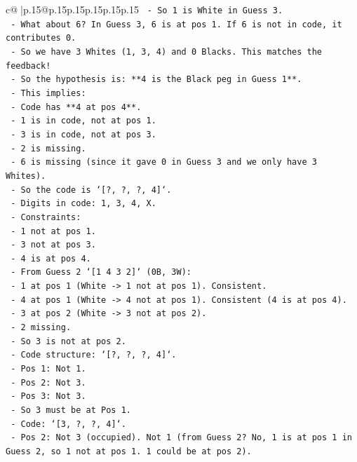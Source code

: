 \documentclass{article}
\begin{document}
{\begin{supertabular}{c@{$\;$}|p{.15\linewidth}@{}p{.15\linewidth}p{.15\linewidth}p{.15\linewidth}p{.15\linewidth}p{.15\linewidth}}
{{{\texttt{    {-} So 1 is White in Guess 3.} \\
\texttt{    {-} What about 6? In Guess 3, 6 is at pos 1. If 6 is not in code, it contributes 0.} \\
\texttt{    {-} So we have 3 Whites (1, 3, 4) and 0 Blacks. This matches the feedback!} \\
\texttt{    {-} So the hypothesis is: **4 is the Black peg in Guess 1**.} \\
\texttt{    {-} This implies:} \\
\texttt{      {-} Code has **4 at pos 4**.} \\
\texttt{      {-} 1 is in code, not at pos 1.} \\
\texttt{      {-} 3 is in code, not at pos 3.} \\
\texttt{      {-} 2 is missing.} \\
\texttt{      {-} 6 is missing (since it gave 0 in Guess 3 and we only have 3 Whites).} \\
\texttt{    {-} So the code is `{[}?, ?, ?, 4{]}`.} \\
\texttt{    {-} Digits in code: 1, 3, 4, X.} \\
\texttt{    {-} Constraints:} \\
\texttt{      {-} 1 not at pos 1.} \\
\texttt{      {-} 3 not at pos 3.} \\
\texttt{      {-} 4 is at pos 4.} \\
\texttt{    {-} From Guess 2 `{[}1 4 3 2{]}` (0B, 3W):} \\
\texttt{      {-} 1 at pos 1 (White {-}> 1 not at pos 1). Consistent.} \\
\texttt{      {-} 4 at pos 1 (White {-}> 4 not at pos 1). Consistent (4 is at pos 4).} \\
\texttt{      {-} 3 at pos 2 (White {-}> 3 not at pos 2).} \\
\texttt{      {-} 2 missing.} \\
\texttt{    {-} So 3 is not at pos 2.} \\
\texttt{    {-} Code structure: `{[}?, ?, ?, 4{]}`.} \\
\texttt{    {-} Pos 1: Not 1.} \\
\texttt{    {-} Pos 2: Not 3.} \\
\texttt{    {-} Pos 3: Not 3.} \\
\texttt{    {-} So 3 must be at Pos 1.} \\
\texttt{    {-} Code: `{[}3, ?, ?, 4{]}`.} \\
\texttt{    {-} Pos 2: Not 3 (occupied). Not 1 (from Guess 2? No, 1 is at pos 1 in Guess 2, so 1 not at pos 1. 1 could be at pos 2).} \\
}}}
\end{supertabular}}
\end{document}
